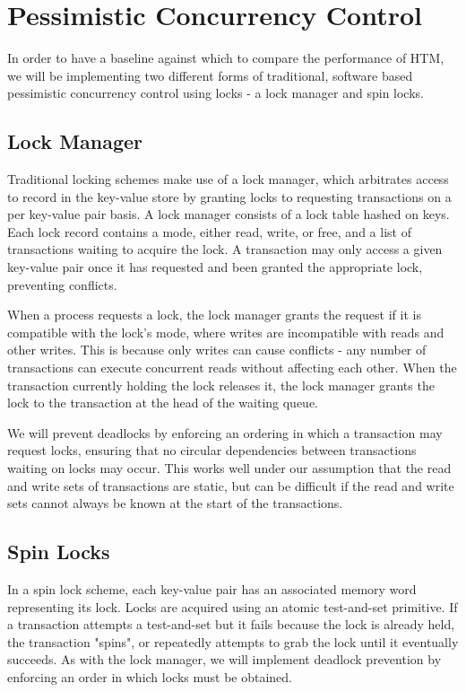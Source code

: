 \section{Pessimistic Concurrency Control} \label{sec:pessimistic}

In order to have a baseline against which to compare the performance of HTM, we
will be implementing two different forms of traditional, software based
pessimistic concurrency control using locks - a lock manager and spin locks.

\subsection{Lock Manager}

Traditional locking schemes make use of a lock manager, which arbitrates access
to record in the key-value store by granting locks to requesting transactions on
a per key-value pair basis. A lock manager consists of a lock table hashed on
keys. Each lock record contains a mode, either read, write, or free, and a list
of transactions waiting to acquire the lock. A transaction may only access a
given key-value pair once it has requested and been granted the appropriate
lock, preventing conflicts.

When a process requests a lock, the lock manager grants the request if it is
compatible with the lock's mode, where writes are incompatible with reads and
other writes. This is because only writes can cause conflicts - any number of
transactions can execute concurrent reads without affecting each other. When the
transaction currently holding the lock releases it, the lock manager grants the
lock to the transaction at the head of the waiting queue.

We will prevent deadlocks by enforcing an ordering in which a transaction may
request locks, ensuring that no circular dependencies between transactions
waiting on locks may occur. This works well under our assumption that the read
and write sets of transactions are static, but can be difficult if the read and
write sets cannot always be known at the start of the transactions.\\

\subsection{Spin Locks}

In a spin lock scheme, each key-value pair has an associated memory word
representing its lock. Locks are acquired using an atomic test-and-set
primitive. If a transaction attempts a test-and-set but it fails because the
lock is already held, the transaction "spins", or repeatedly attempts to grab
the lock until it eventually succeeds. As with the lock manager, we will
implement deadlock prevention by enforcing an order in which locks must be
obtained.

